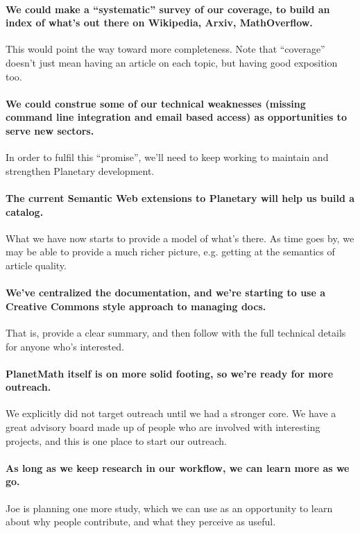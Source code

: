 \paragraph{We could make a ``systematic'' survey of our coverage, to build
  an index of what's out there on Wikipedia, Arxiv, MathOverflow.}
This would point the way toward more completeness.  Note that
``coverage'' doesn't just mean having an article on each topic, but
having good exposition too.

\paragraph{We could construe some of our technical weaknesses (missing
  command line integration and email based access) as opportunities to
  serve new sectors.}  In order to fulfil this ``promise'', we'll need
to keep working to maintain and strengthen Planetary development.

\paragraph{The current Semantic Web extensions to Planetary will help us
  build a catalog.}  What we have now starts to provide a model of
what's there.  As time goes by, we may be able to provide a much
richer picture, e.g. getting at the semantics of article quality.

\paragraph{We've centralized the documentation, and we're starting to use a
  Creative Commons style approach to managing docs.}  That is, provide
a clear summary, and then follow with the full technical details for
anyone who's interested.

\paragraph{PlanetMath itself is on more solid footing, so we're ready for
  more outreach.}  We explicitly did not target outreach until we had
a stronger core.  We have a great advisory board made up of people who
are involved with interesting projects, and this is one place to start
our outreach.

\paragraph{As long as we keep research in our workflow, we can learn more as
  we go.} Joe is planning one more study, which we can use as an
opportunity to learn about why people contribute, and
what they perceive as useful.  

